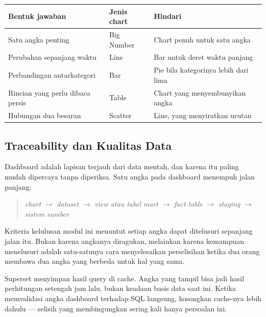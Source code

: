 \begin{center}
\small
\begin{tabular}{@{}p{}>{\raggedright\arraybackslash}p{}>{\raggedright\arraybackslash}p{}@{}}
\toprule
\textbf{Bentuk jawaban} & \textbf{Jenis chart} & \textbf{Hindari} \\
\midrule
Satu angka penting & Big Number & Chart penuh untuk satu angka \\
Perubahan sepanjang waktu & Line & Bar untuk deret waktu panjang \\
Perbandingan antarkategori & Bar & Pie bila kategorinya lebih dari lima \\
Rincian yang perlu dibaca persis & Table & Chart yang menyembunyikan angka \\
Hubungan dua besaran & Scatter & Line, yang menyiratkan urutan \\
\bottomrule
\end{tabular}
\end{center}

\subsection{Traceability dan Kualitas Data}

Dashboard adalah lapisan terjauh dari data mentah, dan karena itu paling mudah
dipercaya tanpa diperiksa. Satu angka pada dashboard menempuh jalan panjang:

\begin{quote}
\emph{chart} $\rightarrow$ \emph{dataset} $\rightarrow$ \emph{view atau tabel
mart} $\rightarrow$ \emph{fact table} $\rightarrow$ \emph{staging}
$\rightarrow$ \emph{sistem sumber}
\end{quote}

Kriteria kelulusan modul ini menuntut setiap angka dapat ditelusuri sepanjang
jalan itu. Bukan karena angkanya diragukan, melainkan karena kemampuan
menelusuri adalah satu-satunya cara menyelesaikan perselisihan ketika dua orang
membawa dua angka yang berbeda untuk hal yang sama.

\begin{peringatan}
Superset menyimpan hasil query di cache. Angka yang tampil bisa jadi hasil
perhitungan setengah jam lalu, bukan keadaan basis data saat ini. Ketika
memvalidasi angka dashboard terhadap SQL langsung, kosongkan cache-nya lebih
dahulu --- selisih yang membingungkan sering kali hanya persoalan ini.
\end{peringatan}

